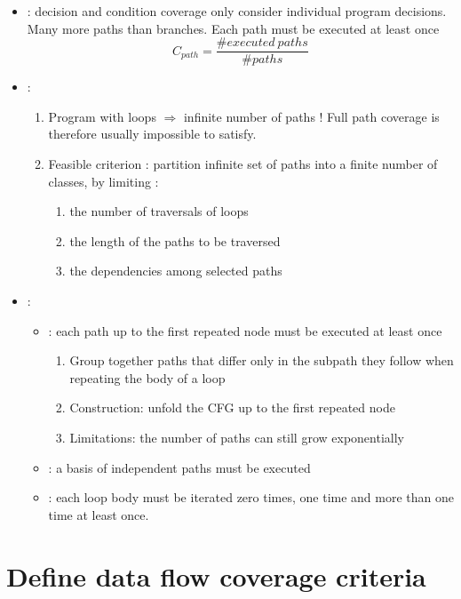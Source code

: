 \begin{itemize}
    \item {} : decision and condition coverage only consider individual program decisions. Many more paths than branches. Each path must be executed at least once
    $$C_{path} = \frac{\#executed\ paths}{\#paths}$$
    \item {} :
    \begin{enumerate}
        \item Program with loops $\Rightarrow$ infinite number of paths ! Full path coverage is therefore usually impossible to satisfy.
        \item Feasible criterion : partition infinite set of paths into a finite number of classes, by limiting :
        \begin{enumerate}
            \item the number of traversals of loops
            \item the length of the paths to be traversed
            \item the dependencies among selected paths
        \end{enumerate}
    \end{enumerate}
    \item {} :
    \begin{itemize}
        \item {} : each path up to the first repeated node must be executed at least once
        \begin{enumerate}
            \item Group together paths that differ only in the subpath they follow when repeating the body of a loop
            \item Construction: unfold the CFG up to the first repeated node
            \item Limitations: the number of paths can still grow exponentially
        \end{enumerate}
        \item {}: a basis of independent paths must be executed
        \item {}: each loop body must be iterated zero times, one time and more than one time at least once.
    \end{itemize}
\end{itemize}

\section{Define data flow coverage criteria}

